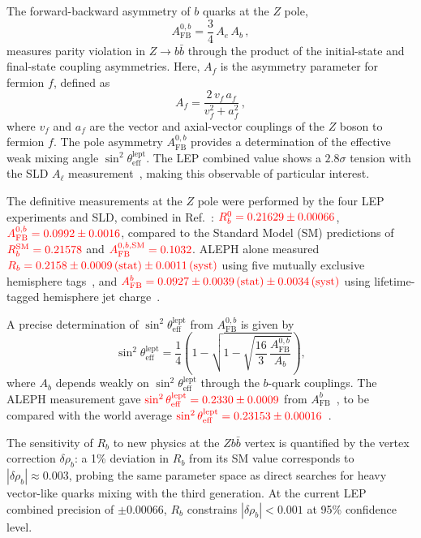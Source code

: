 \documentclass[11pt,a4paper]{article}
\newcommand{\external}[1]{\textcolor{red}{#1}}
\begin{document}
The forward-backward asymmetry of $b$ quarks at the $Z$ pole,
\begin{equation}
A_\text{FB}^{0,b} = \frac{3}{4}\, A_e \, A_b\,,
\label{eq:AFBb_def}
\end{equation}
measures parity violation in $Z \to b\bar{b}$ through the product
of the initial-state and final-state coupling asymmetries.
Here, $A_f$ is the asymmetry parameter for fermion $f$, defined as
\begin{equation}
A_f = \frac{2\, v_f\, a_f}{v_f^2 + a_f^2}\,,
\label{eq:Af_def}
\end{equation}
where $v_f$ and $a_f$ are the vector and axial-vector couplings of
the $Z$ boson to fermion $f$.
The pole asymmetry $A_\text{FB}^{0,b}$ provides a determination of
the effective weak mixing angle $\sin^2\theta_\text{eff}^\text{lept}$.
The LEP combined value shows a $2.8\sigma$ tension with the SLD
$A_\ell$ measurement~\cite{LEP:EWWG:2005}, making this observable
of particular interest.

The definitive measurements at the $Z$ pole were performed by the
four LEP experiments and SLD, combined in
Ref.~\cite{LEP:EWWG:2005}:
$\external{R_b^0 = 0.21629 \pm 0.00066}$,
$\external{A_\text{FB}^{0,b} = 0.0992 \pm 0.0016}$,
compared to the Standard Model (SM) predictions of
$\external{R_b^\text{SM} = 0.21578}$ and
$\external{A_\text{FB}^{0,b,\text{SM}} = 0.1032}$.
ALEPH alone measured
$\external{R_b = 0.2158 \pm 0.0009\,\text{(stat)} \pm 0.0011\,\text{(syst)}}$
using five mutually exclusive hemisphere tags~\cite{ALEPH:Rb:1996},
and
$\external{A_\text{FB}^b = 0.0927 \pm 0.0039\,\text{(stat)} \pm 0.0034\,\text{(syst)}}$
using lifetime-tagged hemisphere jet charge~\cite{ALEPH:AFBb}.

A precise determination of $\sin^2\theta_\text{eff}^\text{lept}$ from
$A_\text{FB}^{0,b}$ is given by
\begin{equation}
\sin^2\theta_\text{eff}^\text{lept} = \frac{1}{4}\left(1 -
\sqrt{1 - \sqrt{\frac{16}{3}\,\frac{A_\text{FB}^{0,b}}{A_b}}}\right),
\label{eq:sin2theta}
\end{equation}
where $A_b$ depends weakly on $\sin^2\theta_\text{eff}^\text{lept}$
through the $b$-quark couplings.
The ALEPH measurement gave
$\external{\sin^2\theta_\text{eff}^\text{lept} = 0.2330 \pm 0.0009}$
from $A_\text{FB}^b$~\cite{ALEPH:AFBb}, to be compared with the
world average
$\external{\sin^2\theta_\text{eff}^\text{lept} = 0.23153 \pm 0.00016}$~\cite{LEP:EWWG:2005}.

The sensitivity of $R_b$ to new physics at the $Zb\bar{b}$ vertex
is quantified by the vertex correction $\delta\rho_b$: a 1\%
deviation in $R_b$ from its SM value corresponds to
$|\delta\rho_b| \approx 0.003$, probing the same parameter space
as direct searches for heavy vector-like quarks mixing with the
third generation.
At the current LEP combined precision of $\pm 0.00066$, $R_b$
constrains $|\delta\rho_b| < 0.001$ at 95\% confidence level.
\end{document}

